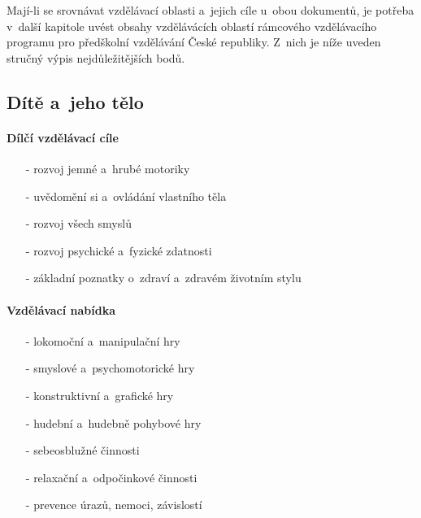 		Mají-li se srovnávat vzdělávací oblasti a~jejich cíle u~obou dokumentů, je potřeba v~další kapitole uvést obsahy vzdělávácích oblastí rámcového vzdělávacího programu pro předškolní vzdělávání České republiky. Z~nich je níže uveden stručný výpis nejdůležitějších bodů. 

			\subsection{Dítě a~jeho tělo}
				\textit{} \citep[s.~16]{RVP}

				\paragraph{Dílčí vzdělávací cíle} 

				\begin{itemize}
				\setlength\itemsep{-2mm}
					\item[-]rozvoj jemné a~hrubé motoriky
					\item[-]uvědomění si a~ovládání vlastního těla
					\item[-]rozvoj všech smyslů
					\item[-]rozvoj psychické a~fyzické zdatnosti
					\item[-]základní poznatky o~zdraví a~zdravém životním stylu
				\end{itemize}

				\paragraph{Vzdělávací nabídka}

				\begin{itemize}
				\setlength\itemsep{-2mm}
					\item[-]lokomoční a~manipulační hry
					\item[-]smyslové a~psychomotorické hry
					\item[-]konstruktivní a~grafické hry
					\item[-]hudební a~hudebně pohybové hry
					\item[-]sebeosblužné činnosti
					\item[-]relaxační a~odpočinkové činnosti
					\item[-]prevence úrazů, nemoci, závislostí
				\end{itemize}


